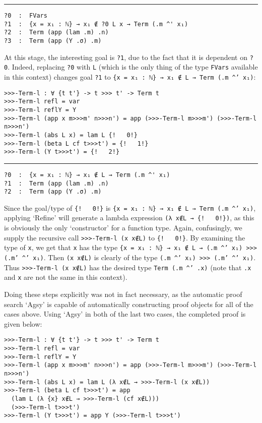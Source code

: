 \documentclass[a4paper, 12pt, twoside]{style/ociamthesis}
\theoremstyle{plain}
\theoremstyle{definition}
\newtheorem{Example}{Example}[chapter]
\theoremstyle{remark}
\renewenvironment{Example}{\begin{OldExample}\begin{mdframed}[style=example, linecolor=yellow]}{\end{mdframed}\end{OldExample}}
\begin{document}
\begin{Example}
\noindent\rule{8cm}{0.4pt}

\begin{verbatim}
?0  :  FVars
?1  :  {x = x₁ : ℕ} → x₁ ∉ ?0 L x → Term (.m ^' x₁)
?2  :  Term (app (lam .m) .n)
?3  :  Term (app (Y .σ) .m)
\end{verbatim}

At this stage, the interesting goal is \texttt{?1}, due to the fact that
it is dependent on \texttt{?0}. Indeed, replacing \texttt{?0} with
\texttt{L} (which is the only thing of the type \texttt{FVars} available
in this context) changes goal \texttt{?1} to
\texttt{\{x = x₁ : ℕ\} → x₁ ∉ L → Term (.m \textasciicircum' x₁)}:

\begin{verbatim}
>>>-Term-l : ∀ {t t'} -> t >>> t' -> Term t
>>>-Term-l refl = var
>>>-Term-l reflY = Y
>>>-Term-l (app x m>>>m' n>>>n') = app (>>>-Term-l m>>>m') (>>>-Term-l n>>>n')
>>>-Term-l (abs L x) = lam L {!   0!}
>>>-Term-l (beta L cf t>>>t') = {!   1!}
>>>-Term-l (Y t>>>t') = {!   2!}
\end{verbatim}

\noindent\rule{8cm}{0.4pt}

\begin{verbatim}
?0  :  {x = x₁ : ℕ} → x₁ ∉ L → Term (.m ^' x₁)
?1  :  Term (app (lam .m) .n)
?2  :  Term (app (Y .σ) .m)
\end{verbatim}

Since the goal/type of \texttt{\{!\ \ \ 0!\}} is
\texttt{\{x = x₁ : ℕ\} → x₁ ∉ L → Term (.m \textasciicircum' x₁)},
applying `Refine' will generate a lambda expression
\texttt{(λ x∉L → \{!\ \ \ 0!\})}, as this is obviously the only
`constructor' for a function type. Again, confusingly, we supply the
recursive call \texttt{>>>-Term-l (x x∉L)} to \texttt{\{!\ \ \ 0!\}}. By
examining the type of \texttt{x}, we get that \texttt{x} has the type
\texttt{\{x = x₁ : ℕ\} → x₁ ∉ L → (.m \textasciicircum' x₁) >>> (.m' \textasciicircum' x₁)}.
Then \texttt{(x x∉L)} is clearly of the type
\texttt{(.m \textasciicircum' x₁) >>> (.m' \textasciicircum' x₁)}. Thus
\texttt{>>>-Term-l (x x∉L)} has the desired type
\texttt{Term (.m \textasciicircum' .x)} (note that \texttt{.x} and
\texttt{x} are not the same in this context).

Doing these steps explicitly was not in fact necessary, as the automatic
proof search `Agsy' is capable of automatically constructing proof
objects for all of the cases above. Using `Agsy' in both of the last two
cases, the completed proof is given below:

\begin{verbatim}
>>>-Term-l : ∀ {t t'} -> t >>> t' -> Term t
>>>-Term-l refl = var
>>>-Term-l reflY = Y
>>>-Term-l (app x m>>>m' n>>>n') = app (>>>-Term-l m>>>m') (>>>-Term-l n>>>n')
>>>-Term-l (abs L x) = lam L (λ x∉L → >>>-Term-l (x x∉L))
>>>-Term-l (beta L cf t>>>t') = app 
  (lam L (λ {x} x∉L → >>>-Term-l (cf x∉L))) 
  (>>>-Term-l t>>>t')
>>>-Term-l (Y t>>>t') = app Y (>>>-Term-l t>>>t')
\end{verbatim}

\end{Example}
\end{document}
